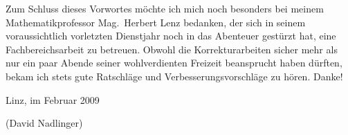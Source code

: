 Zum Schluss dieses Vorwortes möchte ich mich noch besonders bei meinem Mathematikprofessor Mag.~Herbert Lenz bedanken, der sich in seinem voraussichtlich vorletzten Dienstjahr noch in das Abenteuer gestürzt hat, eine Fachbereichsarbeit zu betreuen. Obwohl die Korrekturarbeiten sicher mehr als nur ein paar Abende seiner wohlverdienten Freizeit beansprucht haben dürften, bekam ich stets gute Ratschläge und Verbesserungsvorschläge zu hören. Danke!

\vspace{0.5cm}
Linz, im Februar 2009

\vspace{0.5cm}
{\small(David Nadlinger)}
